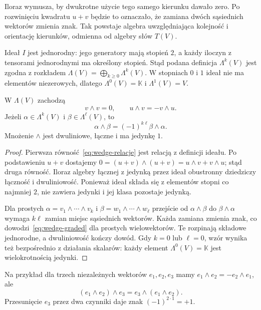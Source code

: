 Iloraz wymusza, by dwukrotne użycie tego samego kierunku
dawało zero. Po rozwinięciu kwadratu $u+v$ będzie to oznaczało,
że zamiana dwóch sąsiednich wektorów zmienia znak.
Tak powstaje algebra uwzględniająca kolejność i orientację
kierunków, odmienna od algebry słów $T(V)$.

Ideał $I$ jest jednorodny: jego generatory mają stopień $2$,
a każdy iloczyn z tensorami jednorodnymi ma określony stopień.
Stąd podana definicja $\Lambda^k(V)$ jest zgodna z rozkładem
$\Lambda(V)=\bigoplus_{k\geq0}\Lambda^k(V)$.
W stopniach $0$ i $1$ ideał nie ma elementów niezerowych, dlatego
$\Lambda^0(V)=\mathbb K$ i $\Lambda^1(V)=V$.

\begin{stwierdzenie}
\label{prop:wedge-znak}
W $\Lambda(V)$ zachodzą
\begin{equation}\label{eq:wedge-relacje}
 v\wedge v=0,\qquad u\wedge v=-v\wedge u.
\end{equation}
Jeżeli $\alpha\in\Lambda^k(V)$ i $\beta\in\Lambda^\ell(V)$,
to
\begin{equation}\label{eq:wedge-graded}
 \alpha\wedge\beta=(-1)^{k\ell}\beta\wedge\alpha.
\end{equation}
Mnożenie $\wedge$ jest dwuliniowe, łączne i ma jedynkę $1$.
\end{stwierdzenie}
\begin{proof}
Pierwsza równość~\eqref{eq:wedge-relacje} jest relacją
z definicji ideału. Po podstawieniu $u+v$ dostajemy
$0=(u+v)\wedge(u+v)=u\wedge v+v\wedge u$;
stąd druga równość. Iloraz algebry łącznej z jedynką przez
ideał obustronny dziedziczy łączność i dwuliniowość.
Ponieważ ideał składa się z elementów stopni co najmniej $2$,
nie zawiera jedynki i jej klasa pozostaje jedynką.

Dla prostych $\alpha=v_1\wedge\cdots\wedge v_k$ i
$\beta=w_1\wedge\cdots\wedge w_\ell$ przejście od
$\alpha\wedge\beta$ do $\beta\wedge\alpha$ wymaga
$k\ell$ zamian miejsc sąsiednich wektorów. Każda zamiana
zmienia znak, co dowodzi~\eqref{eq:wedge-graded} dla
prostych wielowektorów. Te rozpinają składowe jednorodne,
a dwuliniowość kończy dowód.
Gdy $k=0$ lub $\ell=0$, wzór wynika też bezpośrednio
z działania skalarów: każdy element $\Lambda^0(V)=\mathbb K$
jest wielokrotnością jedynki.
\end{proof}

Na przykład dla trzech niezależnych wektorów
$e_1,e_2,e_3$ mamy $e_1\wedge e_2=-e_2\wedge e_1$,
ale
\[
 (e_1\wedge e_2)\wedge e_3
 =e_3\wedge(e_1\wedge e_2).
\]
Przesunięcie $e_3$ przez dwa czynniki daje znak
$(-1)^{2\cdot1}=+1$.

